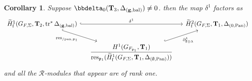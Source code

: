 \documentclass[10pt]{amsart}
\numberwithin{equation}{section}
\newtheorem{cor}[thm]{Corollary}
\theoremstyle{definition}
\theoremstyle{remark} %
\newcommand{\pan}{\mathrm{Pan}}
\DeclareMathOperator{\res}{res}
\renewcommand{\b}{\mathrm{bal}}
\newcommand{\f}{\mathbf{f}}
\newcommand{\g}{\mathbf{g}}
\newcommand{\p}{\mathfrak{p}}
\newcommand{\R}{\mathcal{R}}
\newcommand{\T}{\mathbf{T}}
\begin{document}
		\begin{cor}
			\label{cor : delta_and_delta_rank1}
			Suppose $\bbdelta_0(\T_{3},\Delta_{(\g,\b)}) \ne 0 $. then the map $ \delta^1 $ factors as 
			\begin{equation}
				\begin{tikzcd}[column sep = small]
					\widetilde{H}^1_{\mathrm{f}}(G_{F,\Sigma}, \T_2, \operatorname{tr}^*\Delta_{(\g,\b)}) \arrow[rr, hookrightarrow, "\delta^1"] \arrow[dr, hookrightarrow,"\res_{/\mathrm{pan},\p_1}" ']&&\widetilde{H}^2_{\mathrm{f}}(G_{F,\Sigma}, \T_1, \Delta_{(0,\pan)})\\
					&\dfrac{H^1(G_{F_{\p_1}}, \T_{1})}{\res_{\p_1}(\widetilde{H}^1_{\mathrm{f}}(G_{F,\Sigma},\T_{1}, \Delta_{(\emptyset, \pan)}))} 
					\arrow[ur, hookrightarrow, "\partial_{\f \otimes \lambda}^1" '] &
				\end{tikzcd}
			\end{equation}
			and all the $ \R $-modules that appear are of rank one.
		\end{cor}
		
\end{document}
